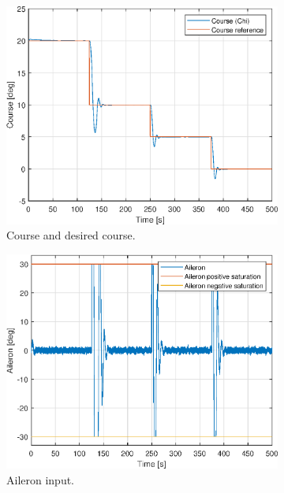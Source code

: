 \begin{figure}[ht]
	\centering
	\begin{subfigure}[b]{0.45\textwidth}
		\includegraphics[width=\textwidth]{figures/3e/chi_course.eps}
		\caption{Course and desired course. }
		\label{fig:3e_chi_course}
	\end{subfigure}
	\begin{subfigure}[b]{0.45\textwidth}
		\includegraphics[width=\textwidth]{figures/3e/delta_a_aileron.eps}
		\caption{Aileron input. }
		\label{fig:3e_delta_a_aileron}
	\end{subfigure}
	\begin{subfigure}[b]{0.45\textwidth}

\end{subfigure}
\end{figure}
